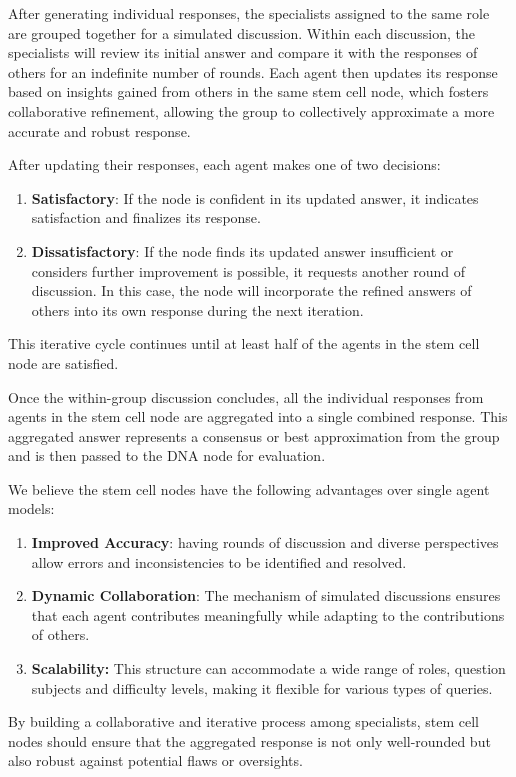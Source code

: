 After generating individual responses, the specialists assigned to the same role are grouped together for a simulated discussion. Within each discussion, the specialists will review its initial answer and compare it with the responses of others for an indefinite number of rounds. Each agent then updates its response based on insights gained from others in the same stem cell node, which fosters collaborative refinement, allowing the group to collectively approximate a more accurate and robust response. 

After updating their responses, each agent makes one of two decisions:
\begin{enumerate}
    \item \textbf{Satisfactory}: If the node is confident in its updated answer, it indicates satisfaction and finalizes its response.
    \item \textbf{Dissatisfactory}: If the node finds its updated answer insufficient or considers further improvement is possible, it requests another round of discussion. In this case, the node will incorporate the refined answers of others into its own response during the next iteration.
\end{enumerate}
This iterative cycle continues until at least half of the agents in the stem cell node are satisfied.

Once the within-group discussion concludes, all the individual responses from agents in the stem cell node are aggregated into a single combined response. This aggregated answer represents a consensus or best approximation from the group and is then passed to the DNA node for evaluation.

We believe the stem cell nodes have the following advantages over single agent models:
\begin{enumerate}
    \item \textbf{Improved Accuracy}: having rounds of discussion and diverse perspectives allow errors and inconsistencies to be identified and resolved.
    \item \textbf{Dynamic Collaboration}: The mechanism of simulated discussions ensures that each agent contributes meaningfully while adapting to the contributions of others.
    \item \textbf{Scalability:} This structure can accommodate a wide range of roles, question subjects and difficulty levels, making it flexible for various types of queries.
\end{enumerate}

By building a collaborative and iterative process among specialists, stem cell nodes should ensure that the aggregated response is not only well-rounded but also robust against potential flaws or oversights. 

